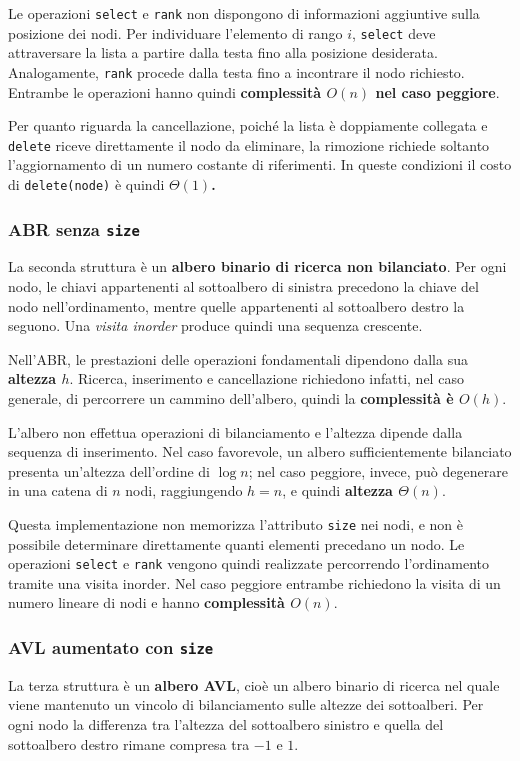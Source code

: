 \documentclass[a4paper,11pt]{article}
\begin{document}
Le operazioni \texttt{select} e \texttt{rank} non dispongono di informazioni aggiuntive sulla posizione dei nodi. Per individuare l'elemento di rango $i$, \texttt{select} deve attraversare la lista a partire dalla testa fino alla posizione desiderata. Analogamente, \texttt{rank} procede dalla testa fino a incontrare il nodo richiesto. Entrambe le operazioni hanno quindi \textbf{complessità $O(n)$ nel caso peggiore}.

Per quanto riguarda la cancellazione, poiché la lista è doppiamente collegata e \texttt{delete} riceve direttamente il nodo da eliminare, la rimozione richiede soltanto l'aggiornamento di un numero costante di riferimenti. In queste condizioni il costo di \texttt{delete(node)} è quindi\textbf{ $\Theta(1)$.}


\subsubsection{ABR senza \texttt{size}}
La seconda struttura è un \textbf{albero binario di ricerca non bilanciato}. Per ogni nodo, le chiavi appartenenti al sottoalbero di sinistra precedono la chiave del nodo nell'ordinamento, mentre quelle appartenenti al sottoalbero destro la seguono. Una \textit{visita inorder} produce quindi una sequenza crescente.

Nell'ABR, le prestazioni delle operazioni fondamentali dipendono dalla sua \textbf{altezza $h$}. Ricerca, inserimento e cancellazione richiedono infatti, nel caso generale, di percorrere un cammino dell'albero, quindi la \textbf{complessità è $O(h)$}.

L'albero non effettua operazioni di bilanciamento e l'altezza dipende dalla sequenza di inserimento. Nel caso favorevole, un albero sufficientemente bilanciato presenta un'altezza dell'ordine di\textbf{ $\log n$}; nel caso peggiore, invece, può degenerare in una catena di $n$ nodi, raggiungendo \textbf{$h = n$},  e quindi \textbf{altezza $\Theta(n)$}.

Questa implementazione non memorizza l'attributo \texttt{size} nei nodi, e non è possibile determinare direttamente quanti elementi precedano un nodo. Le operazioni \texttt{select} e \texttt{rank} vengono quindi realizzate percorrendo l'ordinamento tramite una visita inorder. Nel caso peggiore entrambe richiedono la visita di un numero lineare di nodi e hanno \textbf{complessità $O(n)$}.


\subsubsection{AVL aumentato con \texttt{size}}
La terza struttura è un \textbf{albero AVL}, cioè un albero binario di ricerca nel quale viene mantenuto un vincolo di bilanciamento sulle altezze dei sottoalberi. Per ogni nodo la differenza tra l'altezza del sottoalbero sinistro e quella del sottoalbero destro rimane compresa tra $-1$ e $1$.
\end{document}
